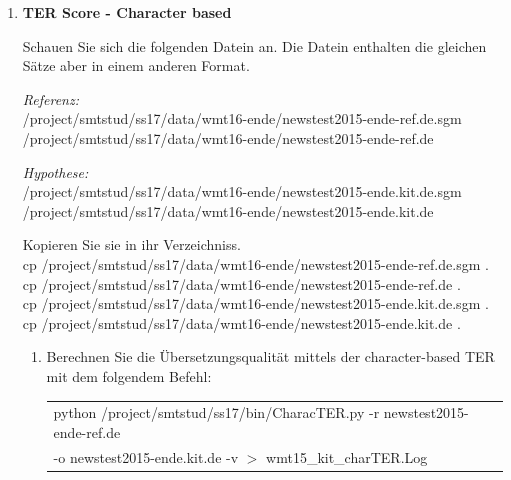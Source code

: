 \documentclass[12pt,fleqn]{article}
\begin{document}
\begin{enumerate}
\vspace{0.5cm} 
\item \textbf{TER Score - Character based} 

\vspace{0.5cm} 

Schauen Sie sich die folgenden Datein an. Die Datein enthalten die gleichen Sätze aber in einem anderen Format.

\vspace{0.5cm}  
\textit{Referenz: } \\ 
/project/smtstud/ss17/data/wmt16-ende/newstest2015-ende-ref.de.sgm \\ 
/project/smtstud/ss17/data/wmt16-ende/newstest2015-ende-ref.de 

\vspace{0.5cm} 
\textit{Hypothese: } \\ 
/project/smtstud/ss17/data/wmt16-ende/newstest2015-ende.kit.de.sgm \\ 
/project/smtstud/ss17/data/wmt16-ende/newstest2015-ende.kit.de 


\vspace{0.5cm} 
Kopieren Sie sie in ihr Verzeichniss. \\ 
cp /project/smtstud/ss17/data/wmt16-ende/newstest2015-ende-ref.de.sgm .  \\
cp /project/smtstud/ss17/data/wmt16-ende/newstest2015-ende-ref.de .  \\ 
cp /project/smtstud/ss17/data/wmt16-ende/newstest2015-ende.kit.de.sgm . \\ 
cp /project/smtstud/ss17/data/wmt16-ende/newstest2015-ende.kit.de . \\ 


\vspace{0.5cm} 
\begin{enumerate} 
\item Berechnen Sie die Übersetzungsqualität mittels der character-based TER mit dem folgendem Befehl:

\vspace{0.5cm} 
\begin{table}[h] 
 \begin{center} 
\begin{tabular}{l} 
python /project/smtstud/ss17/bin/CharacTER.py -r newstest2015-ende-ref.de \\ 
-o newstest2015-ende.kit.de -v $>$ wmt15\_kit\_charTER.Log \\ 
\end{tabular}
 \end{center}
\end{table}


\end{enumerate}
\end{enumerate}
\end{document}
